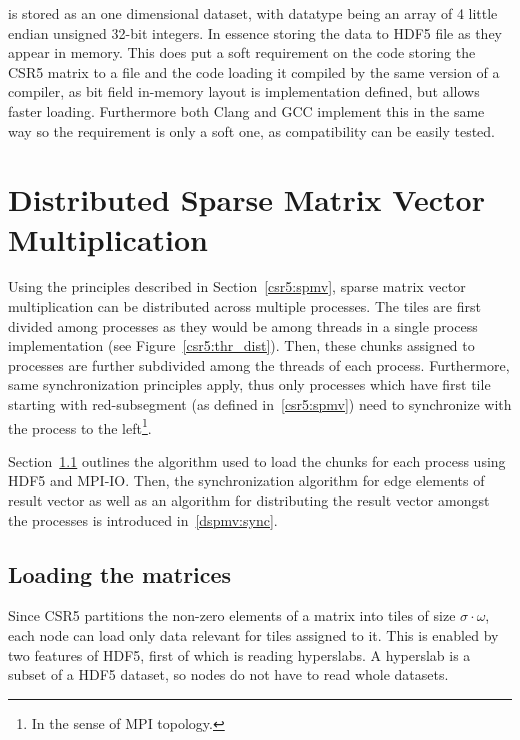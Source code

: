 \documentclass[thesis=M,english]{FITthesis}[2019/12/23]
\begin{document}
 is stored as an one dimensional dataset, with datatype being
an array of 4 little endian unsigned 32-bit integers. In essence storing the data to HDF5 file as
they appear in memory. This does put a soft requirement on the code storing the CSR5 matrix to a file
and the code loading it compiled by the same version of a compiler, as
bit field in-memory layout is implementation defined, but allows faster loading. Furthermore both
Clang and GCC implement this in the same way so the requirement is only a soft one, as compatibility can
be easily tested.



\chapter{Distributed Sparse Matrix Vector Multiplication}

Using the principles described in Section~\ref{csr5:spmv}, sparse matrix vector multiplication can be
distributed across multiple processes. The tiles are first divided among processes as they would be
among threads in a single process implementation (see Figure~\ref{csr5:thr_dist}). Then, these chunks
assigned to processes are further subdivided among the threads of each process. Furthermore, same
synchronization principles apply, thus only processes which have first tile starting with red-subsegment
(as defined in~\ref{csr5:spmv}) need to synchronize with the process to the
left\footnote{In the sense of MPI topology.}.

Section~\ref{dspmv:load} outlines the algorithm used to load the chunks for each process using HDF5 and
MPI-IO. Then, the synchronization algorithm for edge elements of result vector as well as an algorithm for
distributing the result vector amongst the processes is introduced in~\ref{dspmv:sync}.





\section{Loading the matrices}\label{dspmv:load}

Since CSR5 partitions the non-zero elements of a matrix into tiles of
size \(\sigma \cdot \omega\), each node can load only data relevant for tiles
assigned to it. This is enabled by two features of HDF5, first of which
is reading hyperslabs. A hyperslab is a subset of a HDF5 dataset, so
nodes do not have to read whole datasets.
\end{document}
